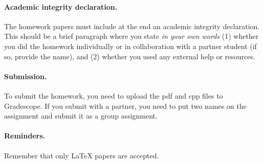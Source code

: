 \documentclass{article}
\begin{document}
\paragraph{Academic integrity declaration.}
The homework papers must include at the end an academic integrity declaration. This should be a brief paragraph where you state
\emph{in your own words}  (1) whether you did the homework individually or in collaboration with a partner student (if so, provide the name), 
and (2) whether you used any external help or resources. 



\vskip 0.1in
\paragraph{Submission.}
To submit the homework, you need to upload the pdf and cpp files to Gradescope. If you submit with a partner, you need
to put two names on the assignment and submit it as a group assignment.

\paragraph{Reminders.}
Remember that only {\LaTeX} papers are accepted. 
\end{document}
